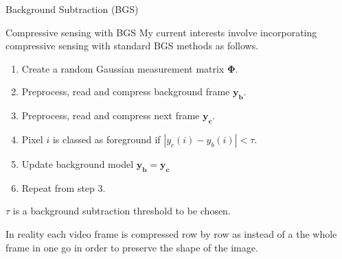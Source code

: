 \documentclass[final]{beamer}
\begin{document}
\begin{frame}{}
\begin{columns}[t]
\begin{column}{0.24\textwidth}
\begin{block}{Background Subtraction (BGS)}
      \end{block}

      \vspace{10pt}
      


      \vspace{10pt}
      
      \begin{block}{Compressive sensing with BGS}
My current interests involve incorporating compressive sensing with standard BGS methods as follows.
\vspace{10pt}
\begin{enumerate}
\item Create a random Gaussian measurement matrix $\pmb{\Phi}$.
\item Preprocess, read and compress background frame $\pmb{y_b}$.
\item Preprocess, read and compress next frame $\pmb{y_c}$.
\item Pixel $i$ is classed as foreground if $|y_c(i) - y_b(i)|< \tau$. 
\item Update background model $\pmb{y_b} = \pmb{y_c}$
\item Repeat from step 3.
\end{enumerate}
\vspace{10pt}
$\tau$ is a background subtraction threshold to be chosen.

\vspace{10pt}

 In reality each video frame is compressed row by row as instead of a the whole frame in one go in order to preserve the shape of the image. 


\vspace{100pt}
      \end{block}

      \end{column}%
    

\end{columns}
\end{frame}
\end{document}
